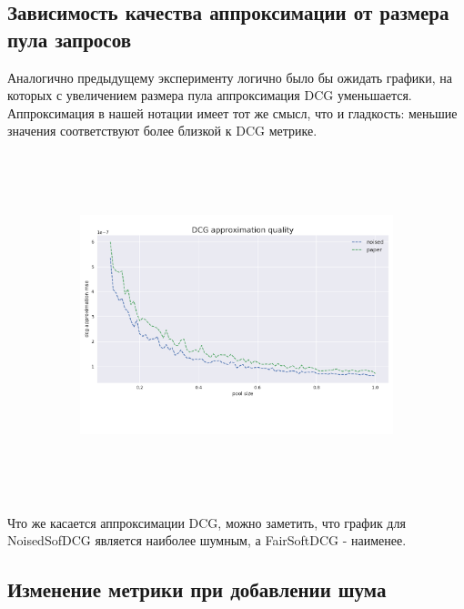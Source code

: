 \documentclass[14pt,a4paper]{amsart}
\theoremstyle{definition}
\theoremstyle{definition}
\begin{document}

\subsection{Зависимость качества аппроксимации от размера пула запросов}

Аналогично предыдущему эксперименту логично было бы ожидать графики, на которых с увеличением размера пула аппроксимация DCG уменьшается. \\

Аппроксимация в нашей нотации имеет тот же смысл, что и гладкость: меньшие значения соответствуют более близкой к DCG метрике.

\begin{figure}[!h]
    \centering
    \begin{subfigure}{\textwidth}
    \centering
        \includegraphics[height=10cm, width=\textwidth]{dcg_approximation}
     \end{subfigure}
\end{figure}

Что же касается аппроксимации DCG, можно заметить, что график для NoisedSofDCG является наиболее шумным, а FairSoftDCG - наименее. 


\subsection{Изменение метрики при добавлении шума}
\end{document}
